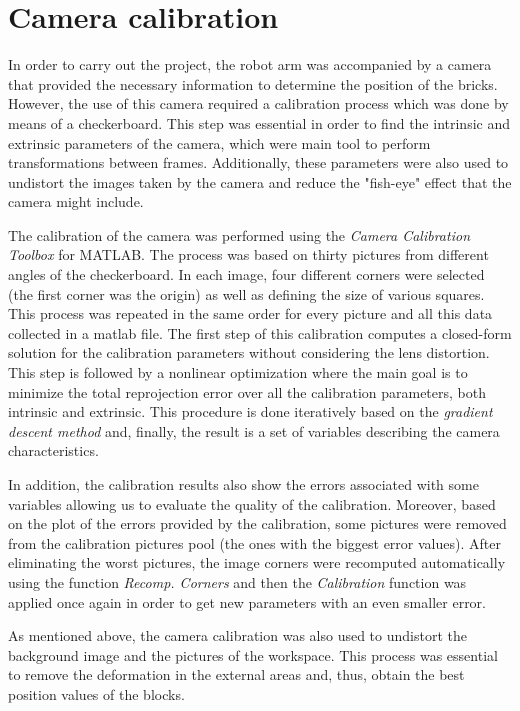\chapter{Camera calibration}\label{ch:calibration}

In order to carry out the project, the robot arm was accompanied by a camera that provided the necessary information to determine the position of the bricks. However, the use of this camera required a calibration process which was done by means of a checkerboard. This step was essential in order to find the intrinsic and extrinsic parameters of the camera, which were main tool to perform transformations between frames. Additionally, these parameters were also used to undistort the images taken by the camera and reduce the "fish-eye" effect that the camera might include.

The calibration of the camera was performed using the \textit{Camera Calibration Toolbox} for MATLAB. The process was based on thirty pictures from different angles of the checkerboard. In each image, four different corners were selected (the first corner was the origin) as well as defining the size of various squares. This process was repeated in the same order for every picture and all this data collected in a matlab file. The first step of this calibration computes a closed-form solution for the calibration parameters without considering the lens distortion. This step is followed by a nonlinear optimization where the main goal is to minimize the total reprojection error over all the calibration parameters, both intrinsic and extrinsic. This procedure is done iteratively based on the \textit{gradient descent method} and, finally, the result is a set of variables describing the camera characteristics. 

In addition, the calibration results also show the errors associated with some variables allowing us to evaluate the quality of the calibration. Moreover, based on the plot of the errors provided by the calibration, some pictures were removed from the calibration pictures pool (the ones with the biggest error values). After eliminating the worst pictures, the image corners were recomputed automatically using the function \textit{Recomp. Corners} and then the \textit{Calibration} function was applied once again in order to get new parameters with an even smaller error.

As mentioned above, the camera calibration was also used to undistort the background image and the pictures of the workspace. This process was essential to remove the deformation in the external areas and, thus, obtain the best position values of the blocks. \par


